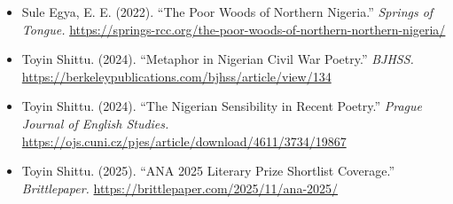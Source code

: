 \begin{itemize}
  Dangerous Ideologists.'' \emph{Shamsrumi.}
  \url{https://www.shamsrumi.org/in-defence-of-poetry-sabouke-versus-dangerous-ideologists-e-e-sule/}
\item
  Sule Egya, E. E. (2022). ``The Poor Woods of Northern Nigeria.''
  \emph{Springs of Tongue.}
  \url{https://springs-rcc.org/the-poor-woods-of-northern-northern-nigeria/}
\item
  Toyin Shittu. (2024). ``Metaphor in Nigerian Civil War Poetry.''
  \emph{BJHSS.}
  \url{https://berkeleypublications.com/bjhss/article/view/134}
\item
  Toyin Shittu. (2024). ``The Nigerian Sensibility in Recent Poetry.''
  \emph{Prague Journal of English Studies.}
  \url{https://ojs.cuni.cz/pjes/article/download/4611/3734/19867}
\item
  Toyin Shittu. (2025). ``ANA 2025 Literary Prize Shortlist Coverage.''
  \emph{Brittlepaper.} \url{https://brittlepaper.com/2025/11/ana-2025/}
\end{itemize}
